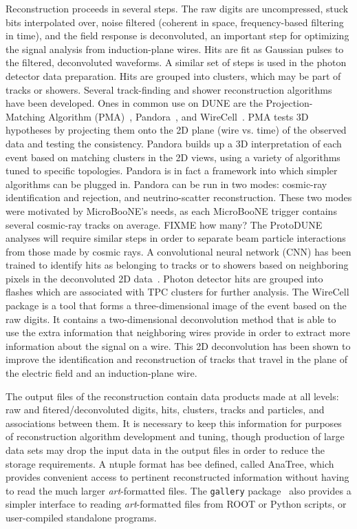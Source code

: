 Reconstruction proceeds in several steps.  The raw digits are uncompressed, stuck bits interpolated over,
noise filtered (coherent in space, frequency-based filtering in time), and the field response is deconvoluted,
an important step for optimizing the signal analysis from induction-plane wires.  Hits are fit as Gaussian
pulses to the filtered, deconvoluted waveforms.  A similar set of steps is used in the photon detector data
preparation.  Hits are grouped into clusters, which may be part of tracks or showers.  Several track-finding
and shower reconstruction algorithms have been developed.  Ones in common use on DUNE are the Projection-Matching
Algorithm (PMA)~\cite{PMA}, Pandora~\cite{Pandora}, and WireCell~\cite{wirecell}.  
PMA tests 3D hypotheses by projecting them onto the  2D plane (wire vs. time) of the observed data and 
testing the consistency.  Pandora builds up a 3D interpretation
of each event based on matching clusters in the 2D views, using a variety of algorithms tuned to specific topologies.
Pandora is in fact a framework into which simpler algorithms can be plugged in.  Pandora can be run in two modes:
cosmic-ray identification and rejection, and neutrino-scatter reconstruction.  These two modes were motivated by
MicroBooNE's needs, as each MicroBooNE trigger contains several cosmic-ray tracks on average.  FIXME how many?
The ProtoDUNE analyses will require similar steps in order to separate beam particle interactions from those
made by cosmic rays.  A convolutional neural network (CNN)
has been trained to identify hits as belonging to tracks or to showers based on neighboring pixels in the 
deconvoluted 2D data~\cite{CNN}.  Photon detector hits are grouped into flashes which are associated with
TPC clusters for further analysis.  The WireCell package is a tool that forms a three-dimensional image of the
event based on the raw digits.  It contains a two-dimensional deconvolution method that is able to use
the extra information that neighboring wires provide in order to extract more information about the signal on
a wire.  This 2D deconvolution has been shown to improve the identification and reconstruction of tracks that
travel in the plane of the electric field and an induction-plane wire.


The output files of the reconstruction contain data products made at all levels: raw and fitered/deconvoluted
digits, hits, clusters, tracks and particles, and associations between them.  It is necessary to keep this information
for purposes of reconstruction algorithm development and tuning, though production of large data sets may
drop the input data in the output files in order to reduce the storage requirements.  A ntuple format has bee
defined, called AnaTree, which provides convenient access to pertinent reconstructed information without
having to read the much larger {\it art}-formatted files.  The {\tt gallery} package~\cite{gallery} also provides
a simpler interface to reading {\it art}-formatted files from ROOT or Python scripts, or user-compiled standalone
programs.

